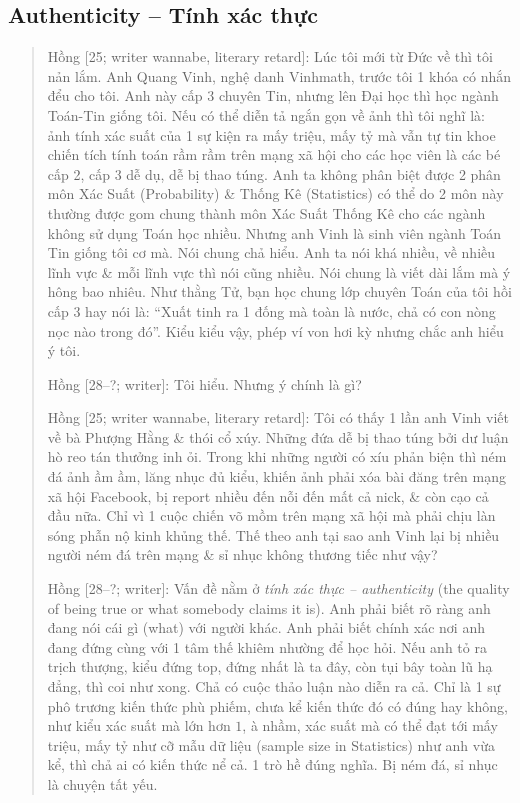 \documentclass[12pt]{article}
\begin{document}
\subsection{Authenticity -- Tính xác thực}

\begin{quotation}
	{\sf Hồng [25; writer wannabe, literary retard]}: Lúc tôi mới từ Đức về thì tôi nản lắm. Anh Quang Vinh, nghệ danh Vinhmath, trước tôi 1 khóa có nhắn đểu cho tôi. Anh này cấp 3 chuyên Tin, nhưng lên Đại học thì học ngành Toán-Tin giống tôi. Nếu có thể diễn tả ngắn gọn về ảnh thì tôi nghĩ là: ảnh tính xác suất của 1 sự kiện ra mấy triệu, mấy tỷ mà vẫn tự tin khoe chiến tích tính toán rầm rầm trên mạng xã hội cho các học viên là các bé cấp 2, cấp 3 dễ dụ, dễ bị thao túng. Anh ta không phân biệt được 2 phân môn Xác Suất (Probability) \& Thống Kê (Statistics) có thể do 2 môn này thường được gom chung thành môn Xác Suất Thống Kê cho các ngành không sử dụng Toán học nhiều. Nhưng anh Vinh là sinh viên ngành Toán Tin giống tôi cơ mà. Nói chung chả hiểu. Anh ta nói khá nhiều, về nhiều lĩnh vực \& mỗi lĩnh vực thì nói cũng nhiều. Nói chung là viết dài lắm mà ý hông bao nhiêu. Như thằng Tử, bạn học chung lớp chuyên Toán của tôi hồi cấp 3 hay nói là: ``Xuất tinh ra 1 đống mà toàn là nước, chả có con nòng nọc nào trong đó''. Kiểu kiểu vậy, phép ví von hơi kỳ nhưng chắc anh hiểu ý tôi.
	
	{\sf Hồng [28--?; writer]}: Tôi hiểu. Nhưng ý chính là gì?
	
	{\sf Hồng [25; writer wannabe, literary retard]}: Tôi có thấy 1 lần anh Vinh viết về bà Phượng Hằng \& thói cổ xúy. Những đứa dễ bị thao túng bởi dư luận hò reo tán thưởng inh ỏi. Trong khi những người có xíu phản biện thì ném đá ảnh ầm ầm, lăng nhục đủ kiểu, khiến ảnh phải xóa bài đăng trên mạng xã hội Facebook, bị report nhiều đến nỗi đến mất cả nick, \& còn cạo cả đầu nữa. Chỉ vì 1 cuộc chiến võ mồm trên mạng xã hội mà phải chịu làn sóng phẫn nộ kinh khủng thế. Thế theo anh tại sao anh Vinh lại bị nhiều người ném đá trên mạng \& sỉ nhục không thương tiếc như vậy?
	
	{\sf Hồng [28--?; writer]}: Vấn đề nằm ở {\it tính xác thực -- authenticity} ({\sf[n] the quality of being true or what somebody claims it is}). Anh phải biết rõ ràng anh đang nói cái gì (what) với người khác. Anh phải biết chính xác nơi anh đang đứng cùng với 1 tâm thế khiêm nhường để học hỏi. Nếu anh tỏ ra trịch thượng, kiểu đứng top, đứng nhất là ta đây, còn tụi bây toàn lũ hạ đẳng, thì coi như xong. Chả có cuộc thảo luận nào diễn ra cả. Chỉ là 1 sự phô trương kiến thức phù phiếm, chưa kể kiến thức đó có đúng hay không, như kiểu xác suất mà lớn hơn $1$, à nhầm, xác suất mà có thể đạt tới mấy triệu, mấy tỷ như cỡ mẫu dữ liệu (sample size in Statistics) như anh vừa kể, thì chả ai có kiến thức nể cả. 1 trò hề đúng nghĩa. Bị ném đá, sỉ nhục là chuyện tất yếu.
	

\end{quotation}
\end{document}
